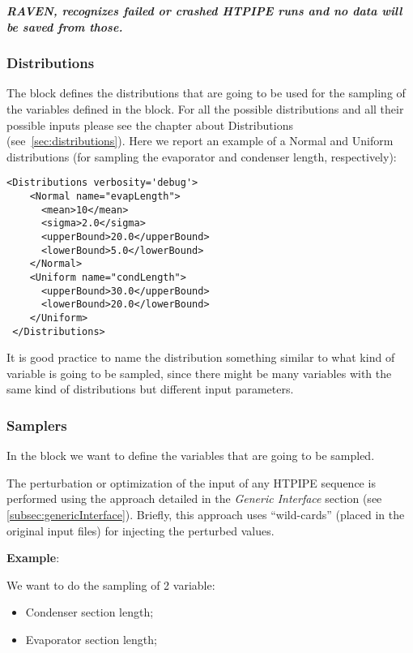 \textbf{\textit{\nb RAVEN, recognizes failed or crashed HTPIPE runs and no data will be saved from those.}}

\subsubsection{Distributions}
The  block defines the distributions that are going
to be used for the sampling of the variables defined in the  block.
%
For all the possible distributions and all their possible inputs please see the
chapter about Distributions (see~\ref{sec:distributions}).
%
Here we report an example of a Normal and Uniform distributions (for sampling the evaporator and condenser length, respectively):

\begin{lstlisting}[style=XML,morekeywords={name,debug}]
<Distributions verbosity='debug'>
    <Normal name="evapLength">
      <mean>10</mean>
      <sigma>2.0</sigma>
      <upperBound>20.0</upperBound>
      <lowerBound>5.0</lowerBound>
    </Normal>
    <Uniform name="condLength">
      <upperBound>30.0</upperBound>
      <lowerBound>20.0</lowerBound>
    </Uniform>
 </Distributions>
\end{lstlisting}

\noindent
It is good practice to name the distribution something similar to what kind of
variable is going to be sampled, since there might be many variables with the
same kind of distributions but different input parameters.

\subsubsection{Samplers}
In the  block we want to define the variables that are going to be sampled.

\noindent The perturbation or optimization of the input of any HTPIPE sequence is performed using the approach detailed in the \textit{Generic Interface} section (see \ref{subsec:genericInterface}). 
Briefly, this approach uses
 ``wild-cards'' (placed in the original input files) for injecting the perturbed values.

\textbf{Example}:

We want to do the sampling of 2 variable:
\begin{itemize}
  \item Condenser section length;
  \item Evaporator section length;
\end{itemize}


